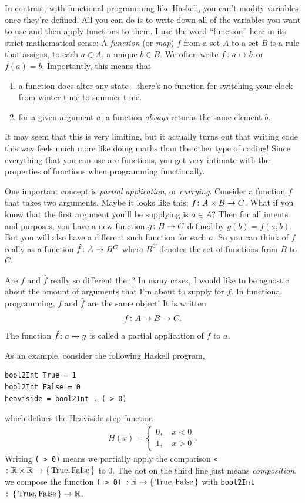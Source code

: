 \documentclass[english, 12pt]{article}
\begin{document}
In contrast, with functional programming like Haskell, you can't modify variables once they're defined.
All you can do is to write down all of the variables you want to use and then apply functions to them.
I use the word \enquote{function} here in its strict mathematical sense: A \emph{function} (or \emph{map}) $f$ from a set $A$ to a set $B$ is a rule that assigns, to each $a \in A$, a unique $b \in B$.
We often write $f \colon a \mapsto b$ or $f(a) = b$.
Importantly, this means that
\begin{enumerate}
	\item a function does alter any state---there's no function for switching your clock from winter time to summer time.
	\item for a given argument $a$, a function \emph{always} returns the same element $b$.
\end{enumerate}

It may seem that this is very limiting, but it actually turns out that writing code this way feels much more like doing maths than the other type of coding!
Since everything that you can use are functions, you get very intimate with the properties of functions when programming functionally.

One important concept is \emph{partial application}, or \emph{currying}.
Consider a function $f$ that takes two arguments.
Maybe it looks like this: $f \colon A \times B \to C$.
What if you know that the first argument you'll be supplying is $a \in A$?
Then for all intents and purposes, you have a new function $g \colon B \to C$ defined by $g(b) = f(a, b)$.
But you will also have a different such function for each $a$.
So you can think of $f$ really as a function $\hat f\colon A \to B^C$ where $B^C$ denotes the set of functions from $B$ to $C$.

Are $f$ and $\hat f$ really so different then?
In many cases, I would like to be agnostic about the amount of arguments that I'm about to supply for $f$.
In functional programming, $f$ and $\hat f$ are the same object!
It is written
\begin{align*}
	f \colon A \to B \to C.
\end{align*}
The function $\hat f \colon a \mapsto g$ is called a partial application of $f$ to $a$.

As an example, consider the following Haskell program,
\begin{verbatim}
bool2Int True = 1
bool2Int False = 0
heaviside = bool2Int . ( > 0)
\end{verbatim}
which defines the Heaviside step function
\begin{align*}
	H(x) =
	\begin{cases}
		0, \quad x < 0\\
		1, \quad x > 0
	\end{cases}.
\end{align*}
Writing \verb|( > 0)| means we partially apply the comparison \verb|<|$\colon \mathbb{R} \times \mathbb{R} \to \set{\textrm{True}, \textrm{False}}$ to $0$.
The dot on the third line just means \emph{composition}, we compose the function \verb|( > 0)| $\colon \mathbb{R} \to \set{\textrm{True}, \textrm{False}}$ with \verb|bool2Int|$\colon \set{\textrm{True}, \textrm{False}} \to \mathbb{R}$.
\end{document}
